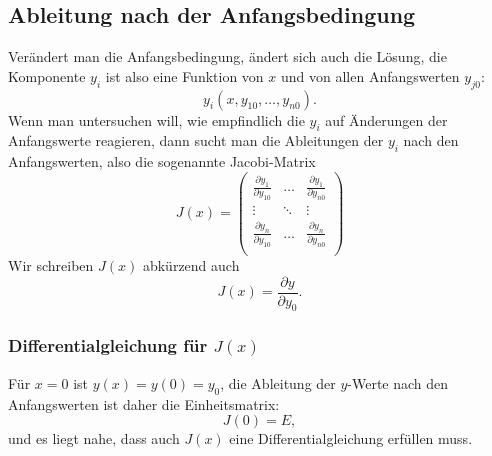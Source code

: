 \subsection{Ableitung nach der Anfangsbedingung\label{grundlagen:jacobi}}
%
Verändert man die Anfangsbedingung, ändert sich auch die Lösung,
die Komponente $y_i$ ist also eine Funktion von $x$ und
von allen Anfangswerten $y_{j0}$:
\[
y_i(x, y_{10},\dots,y_{n0}).
\]
Wenn man untersuchen will, wie empfindlich die $y_i$ auf Änderungen
der Anfangswerte reagieren, dann sucht man die Ableitungen der $y_i$
nach den Anfangswerten, also die sogenannte Jacobi-Matrix
%
\[
J(x)
=
\begin{pmatrix}
\displaystyle\frac{\partial y_1}{\partial y_{10}}&\dots&
	\displaystyle\frac{\partial y_1}{\partial y_{n0}}\\
\vdots&\ddots&\vdots\\
\displaystyle\frac{\partial y_n}{\partial y_{10}}&\dots&
	\displaystyle\frac{\partial y_n}{\partial y_{n0}}\\
\end{pmatrix}
\]
Wir schreiben $J(x)$ abkürzend auch 
\[
J(x)= \frac{\partial y}{\partial y_0}.
\]

\subsubsection{Differentialgleichung für $J(x)$}
Für $x=0$ ist $y(x)=y(0)=y_0$, die Ableitung der $y$-Werte nach den
Anfangswerten ist daher die Einheitsmatrix:
\[
J(0)=E,
\]
und es liegt nahe, dass auch $J(x)$ eine Differentialgleichung erfüllen
muss.

